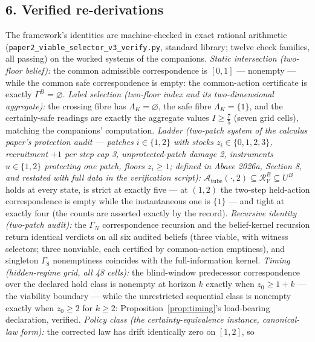 \documentclass[10pt,twocolumn]{article}
\theoremstyle{definition}
\begin{document}
\subsection{6. Verified re-derivations}\label{verified}

The framework's identities are machine-checked in exact rational arithmetic
(\texttt{paper2\_viable\_selector\_v3\_verify.py}, standard library; twelve
check families, all passing) on the worked systems of the companions. \emph{Static intersection
(two-floor belief):} the common admissible correspondence is \([0,1]\) ---
nonempty --- while the common safe correspondence is empty: the
common-action certificate is exactly \(\Gamma^{B} = \varnothing\).
\emph{Label selection (two-floor index and its two-dimensional aggregate):}
the crossing fibre has \(\Lambda_{K} = \varnothing\), the safe fibre
\(\Lambda_{K} = \{1\}\), and the certainly-safe readings are exactly the
aggregate values \(I \ge \tfrac75\) (seven grid cells), matching the
companions' computation. \emph{Ladder (two-patch system of the calculus paper's protection
audit --- patches \(i \in \{1,2\}\) with stocks \(z_{i} \in
\{0,1,2,3\}\), recruitment \(+1\) per step cap 3, unprotected-patch
damage 2, instruments \(u \in \{1,2\}\) protecting one patch, floors
\(z_{i} \ge 1\); defined in Abaee 2026a, Section 8, and restated with
full data in the verification script):}
\(\mathcal{A}_{\mathrm{tube}}(\cdot, 2) \subseteq
\mathcal{R}^{B}_{\mathcal{V}} \subseteq U^{B}\) holds at every state, is
strict at exactly five --- at \((1,2)\) the two-step held-action
correspondence is empty while the instantaneous one is \(\{1\}\) ---
and tight at exactly four (the counts are asserted exactly by the
record).
\emph{Recursive identity (two-patch audit):} the \(\Gamma_{N}\) correspondence
recursion and the belief-kernel recursion return identical verdicts on all
six audited beliefs (three viable, with witness selectors; three nonviable,
each certified by common-action emptiness), and singleton
\(\Gamma_{8}\) nonemptiness coincides with the full-information kernel.
\emph{Timing (hidden-regime grid, all 48 cells):} the blind-window
predecessor correspondence over the declared hold class is nonempty at
horizon \(k\) exactly when \(z_{0} \ge 1 + k\) --- the viability boundary ---
while the unrestricted sequential class is nonempty exactly when
\(z_{0} \ge 2\) for \(k \ge 2\): Proposition~\ref{prop:timing}'s
load-bearing declaration, verified. \emph{Policy class (the certainty-equivalence instance, canonical-law
form):} the corrected law has drift identically zero on \([1,2]\), so
\end{document}
